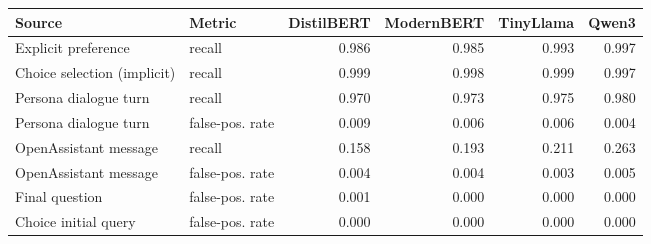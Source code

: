 \begin{tabular}{llrrrr}
\toprule
Source & Metric & DistilBERT & ModernBERT & TinyLlama & Qwen3 \\
\midrule
Explicit preference & recall & 0.986 & 0.985 & 0.993 & 0.997 \\
Choice selection (implicit) & recall & 0.999 & 0.998 & 0.999 & 0.997 \\
Persona dialogue turn & recall & 0.970 & 0.973 & 0.975 & 0.980 \\
Persona dialogue turn & false-pos. rate & 0.009 & 0.006 & 0.006 & 0.004 \\
OpenAssistant message & recall & 0.158 & 0.193 & 0.211 & 0.263 \\
OpenAssistant message & false-pos. rate & 0.004 & 0.004 & 0.003 & 0.005 \\
Final question & false-pos. rate & 0.001 & 0.000 & 0.000 & 0.000 \\
Choice initial query & false-pos. rate & 0.000 & 0.000 & 0.000 & 0.000 \\
\bottomrule
\end{tabular}
